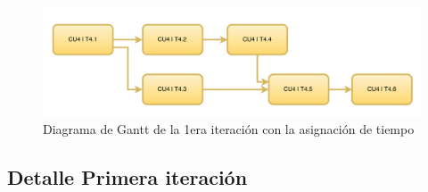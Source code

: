 \documentclass[a4paper, 10pt, twoside]{article}
\begin{document}
\begin{center}
  \begin{figure}[h!]
    \includegraphics[width=15cm]{diagramas/diag-dependecias4.png}
    \caption{Diagrama de Gantt de la 1era iteración con la asignación de tiempo}
    \label{fig:diag-dependecias4}
  \end{figure}
\end{center}

\newpage


\subsection{Detalle Primera iteración}
\end{document}
